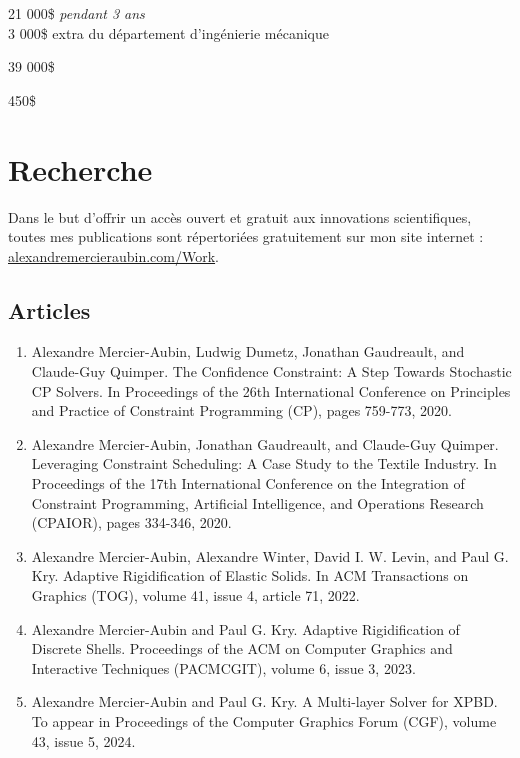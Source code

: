 \documentclass[10pt]{article} %
\begin{document}
{
 21 000\$ \textit{pendant 3 ans} \\
 3 000\$ extra du département d'ingénierie mécanique\\
}

{
\textit{} 39 000\$\\
}


{
\textit{} 450\$\\
}

\section{Recherche}
Dans le but d'offrir un accès ouvert et gratuit aux innovations scientifiques, toutes mes publications sont répertoriées gratuitement sur mon site internet : \href{https://alexandremercieraubin.com/Work}{alexandremercieraubin.com/Work}. 
\subsection{Articles}
%
%
\begin{enumerate}
  \setcounter{enumi}{\value{listCounter}}
  \item Alexandre Mercier-Aubin, Ludwig Dumetz, Jonathan Gaudreault, and Claude-Guy Quimper. The Confidence Constraint: A Step Towards Stochastic CP Solvers. In Proceedings of the 26th International Conference on Principles and Practice of Constraint Programming (CP), pages 759-773, 2020. 

 \item Alexandre Mercier-Aubin, Jonathan Gaudreault, and Claude-Guy Quimper. Leveraging Constraint Scheduling: A Case Study to the Textile Industry. In Proceedings of the 17th International Conference on the Integration of Constraint Programming, Artificial Intelligence, and Operations Research (CPAIOR), pages 334-346, 2020. 

 \item Alexandre Mercier-Aubin,  Alexandre Winter,  David I. W. Levin, and Paul G. Kry. Adaptive Rigidification of Elastic Solids. In ACM Transactions on Graphics (TOG), volume 41, issue 4, article 71, 2022.  

 \item Alexandre Mercier-Aubin and Paul G. Kry. Adaptive Rigidification of Discrete Shells. Proceedings of the ACM on Computer Graphics and Interactive Techniques (PACMCGIT), volume 6, issue 3, 2023. 

\item Alexandre Mercier-Aubin and Paul G. Kry. A Multi-layer Solver for XPBD. To appear in Proceedings of the Computer Graphics Forum (CGF), volume 43, issue 5, 2024.
\end{enumerate}
\end{document}
